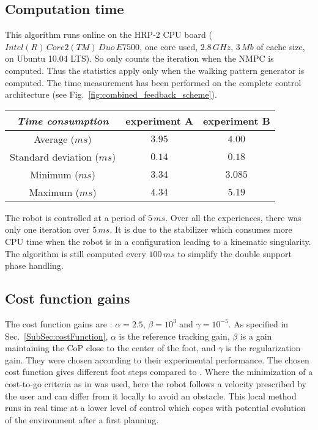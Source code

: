 \subsection{Computation time}

This algorithm runs online on the \mbox{HRP-2} CPU board ($Intel(R) \, Core2(TM) \, Duo \, E7500$, one core used, $2.8 \, GHz$, $3 \, Mb$ of cache size, on Ubuntu 10.04 LTS).
So only counts the iteration when the NMPC is computed.
Thus the statistics apply only when the walking pattern generator is computed.
The time measurement has been performed on the complete control architecture (see Fig.~\ref{fig:combined_feedback_scheme}).
\begin{center}
\begin{tabular}{|c|c|c|}
  \hline
  \emph{Time consumption}  & experiment A & experiment B \\
  \hline
    Average ($ms$)            & $3.95$ & $4.00$ \\
  \hline
    Standard deviation ($ms$) & $0.14$ & $0.18$ \\
  \hline
    Minimum ($ms$)            & $3.34$ & $3.085$ \\
  \hline
    Maximum ($ms$)            & $4.34$ & $5.19$ \\
  \hline
\end{tabular}
\end{center}
The robot is controlled at a period of $5 \, ms $.
Over all the experiences, there was only one iteration over $5 \, ms $. It is due to the stabilizer which consumes more CPU time when the robot is in a configuration leading to a kinematic singularity.
The algorithm is still computed every $100\,ms$ to simplify the double support phase handling.

\subsection{Cost function gains}

The cost function gains are : $\alpha=2.5$, $\beta=10^3$ and $\gamma=10^{-5}$.
As specified in Sec.~\ref{SubSec:costFunction}, $\alpha$ is the reference tracking gain, $\beta$ is a gain maintaining the CoP close to the center of the foot, and $\gamma$ is the regularization gain.
They were chosen according to their experimental performance.
The chosen cost function gives different foot steps compared to \cite{deits:ichr:14}.
Where the minimization of a cost-to-go criteria as in \cite{deits:ichr:14} was used, here the robot follows a velocity prescribed by the user and can differ from it locally to avoid an obstacle.
This local method runs in real time at a lower level of control which copes with potential evolution of the environment after a first planning.

